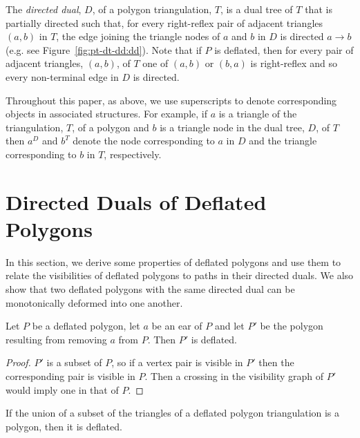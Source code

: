 \documentclass[11pt]{amsart}
\begin{document}
The \emph{directed dual}, $D$, of a polygon triangulation, $T$, is a
dual tree of $T$ that is partially directed such that, for every
right-reflex pair of adjacent triangles $(a, b)$ in $T$, the edge
joining the triangle nodes of $a$ and $b$ in $D$ is directed
$a\rightarrow b$ (e.g. see Figure~\ref{fig:pt-dt-dd:dd}).  Note that
if $P$ is deflated, then for every pair of adjacent triangles, $(a,
b)$, of $T$ one of $(a, b)$ or $(b, a)$ is right-reflex and so every
non-terminal edge in $D$ is directed.

Throughout this paper, as above, we use superscripts to denote
corresponding objects in associated structures.  For example, if $a$
is a triangle of the triangulation, $T$, of a polygon and $b$ is a
triangle node in the dual tree, $D$, of $T$ then $a^D$ and $b^T$
denote the node corresponding to $a$ in $D$ and the triangle
corresponding to $b$ in $T$, respectively.


\section{Directed Duals of Deflated Polygons}

In this section, we derive some properties of deflated polygons and
use them to relate the visibilities of deflated polygons to paths in
their directed duals.  We also show that two deflated polygons with
the same directed dual can be monotonically deformed into one another.

\begin{lemma}
  \label{lem:cutear-defl}
  Let $P$ be a deflated polygon, let $a$ be an ear of $P$ and let $P'$
  be the polygon resulting from removing $a$ from $P$.  Then $P'$ is
  deflated.
\end{lemma}
\begin{proof}
  $P'$ is a subset of $P$, so if a vertex pair is visible in $P'$ then
  the corresponding pair is visible in $P$.  Then a crossing in the
  visibility graph of $P'$ would imply one in that of $P$.
\end{proof}

\begin{corollary}
  \label{cor:subpoly-defl}
  If the union of a subset of the triangles of a deflated polygon
  triangulation is a polygon, then it is deflated.
\end{corollary}
\end{document}
